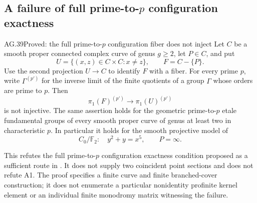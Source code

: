 \subsection{A failure of full prime-to-\texorpdfstring{\(p\)}{p} configuration exactness}

\begin{claim}{AG.39}{Proved: the full prime-to-\(p\) configuration fiber does not inject}
\label{clm:AGconfigurationodd}
Let \(C\) be a smooth proper connected complex curve of genus
\(g\geq2\), let \(P\in C\), and put
\[
 U=\{(x,z)\in C\times C:x\ne z\},\qquad F=C-\{P\}.
\]
Use the second projection \(U\to C\) to identify \(F\) with a
fiber. For every prime \(p\), write \(\Gamma^{(p')}\) for the
inverse limit of the finite quotients of a group \(\Gamma\)
whose orders are prime to \(p\). Then
\[
 \pi_1(F)^{(p')}\longrightarrow
 \pi_1(U)^{(p')}                                     \tag{AG.39.1}
\]
is not injective. The same assertion holds for the geometric
prime-to-\(p\) etale fundamental groups of every smooth proper
curve of genus at least two in characteristic \(p\).
In particular it holds for the smooth projective model of
\[
                    C_0/\mathbb F_2:\quad y^2+y=x^5,
             \qquad P=\infty.                       \tag{AG.39.2}
\]

This refutes the full prime-to-\(p\) configuration exactness
condition proposed as a sufficient route in
\cite[Remark 3.13]{AR_ST2009}. It does not supply two coincident
point sections and does not refute A1. The proof specifies a finite
curve and finite branched-cover construction; it does not enumerate
a particular nonidentity profinite kernel element or an individual
finite monodromy matrix witnessing the failure.
\end{claim}

